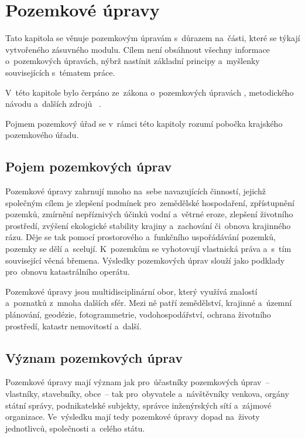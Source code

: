\chapter{Pozemkové úpravy}
\label{pu}

Tato kapitola se věnuje pozemkovým úpravám s~důrazem na~části, které
se týkají vytvořeného zásuvného modulu. Cílem není obsáhnout všechny
informace o~pozem\-kových úpravách, nýbrž nastínit základní principy
a~myšlenky souvisejících s~tématem práce.

V~této kapitole bylo čerpáno ze~zákona o~pozemkových úpravách
\citep{pu_zakon}, metodic\-kého návodu \citep{metodicky_navod}
a~dalších zdrojů \citep{pu_cr}~\citep{pu_skripta}.

Pojmem pozemkový úřad se v~rámci této kapitoly rozumí pobočka
krajského pozemkového úřadu.

\section{Pojem pozemkových úprav}
\label{pojem_pu}

Pozemkové úpravy zahrnují mnoho na~sebe navazujících činností, jejichž
společným cílem je zlepšení podmínek pro~zemědělské hospodaření,
zpřístupnění pozemků, zmírnění nepříznivých účinků vodní a~větrné
eroze, zlepšení životního prostředí, zvýšení ekologické stability
krajiny a~zachování či~obnova krajinného rázu. Děje se tak pomocí
prostorového a~funkčního uspořádávání pozemků, pozemky se dělí
a~scelují. K~pozemkům se vyhotovují vlastnická práva a~s~tím
související věcná břemena. Výsledky pozemkových úprav slouží jako
podklady pro~obnovu katastrálního operátu.

Pozemkové úpravy jsou multidisciplinární obor, který využívá znalostí
a~poznatků z~mnoha dalších sfér. Mezi ně patří zemědělství, krajinné
a~územní plánování, geodézie, fotogrammetrie, vodohospodářství,
ochrana životního prostředí, katastr nemovitostí a~další.

\section{Význam pozemkových úprav}
\label{vyznam_pu}

Pozemkové úpravy mají význam jak pro~účastníky pozemkových úprav~–
vlastníky, stavebníky, obce~– tak pro~obyvatele a~návštěvníky venkova,
orgány státní správy, podnikatelské subjekty, správce inženýrských
sítí a~zájmové organizace. Ve~výsledku mají tedy pozemkové úpravy
dopad na~životy jednotlivců, společnosti a~celého státu.

